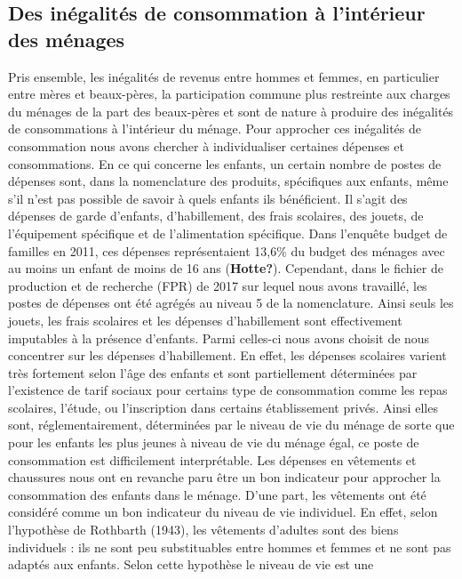 \documentclass[
  12pt,
]{book}
\begin{document}
\subsection{Des inégalités de consommation à l'intérieur des
ménages}\label{des-inuxe9galituxe9s-de-consommation-uxe0-lintuxe9rieur-des-muxe9nages}

Pris ensemble, les inégalités de revenus entre hommes et femmes, en
particulier entre mères et beaux-pères, la participation commune plus
restreinte aux charges du ménages de la part des beaux-pères et sont de
nature à produire des inégalités de consommations à l'intérieur du
ménage. Pour approcher ces inégalités de consommation nous avons
chercher à individualiser certaines dépenses et consommations. En ce qui
concerne les enfants, un certain nombre de postes de dépenses sont, dans
la nomenclature des produits, spécifiques aux enfants, même s'il n'est
pas possible de savoir à quels enfants ils bénéficient. Il s'agit des
dépenses de garde d'enfants, d'habillement, des frais scolaires, des
jouets, de l'équipement spécifique et de l'alimentation spécifique. Dans
l'enquête budget de familles en 2011, ces dépenses représentaient 13,6\%
du budget des ménages avec au moins un enfant de moins de 16 ans
(\textbf{Hotte?}). Cependant, dans le fichier de production et de
recherche (FPR) de 2017 sur lequel nous avons travaillé, les postes de
dépenses ont été agrégés au niveau 5 de la nomenclature. Ainsi seuls les
jouets, les frais scolaires et les dépenses d'habillement sont
effectivement imputables à la présence d'enfants. Parmi celles-ci nous
avons choisit de nous concentrer sur les dépenses d'habillement. En
effet, les dépenses scolaires varient très fortement selon l'âge des
enfants et sont partiellement déterminées par l'existence de tarif
sociaux pour certains type de consommation comme les repas scolaires,
l'étude, ou l'inscription dans certains établissement privés. Ainsi
elles sont, réglementairement, déterminées par le niveau de vie du
ménage de sorte que pour les enfants les plus jeunes à niveau de vie du
ménage égal, ce poste de consommation est difficilement interprétable.
Les dépenses en vêtements et chaussures nous ont en revanche paru être
un bon indicateur pour approcher la consommation des enfants dans le
ménage. D'une part, les vêtements ont été considéré comme un bon
indicateur du niveau de vie individuel. En effet, selon l'hypothèse de
Rothbarth (1943), les vêtements d'adultes sont des biens individuels :
ils ne sont peu substituables entre hommes et femmes et ne sont pas
adaptés aux enfants. Selon cette hypothèse le niveau de vie est une
\end{document}
